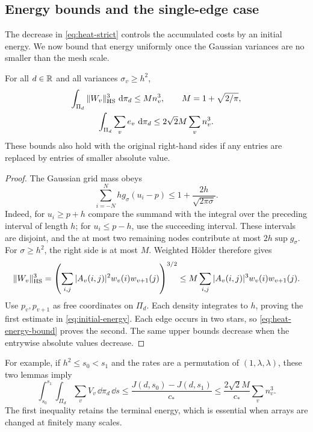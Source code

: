 \subsection{Energy bounds and the single-edge case}

The decrease in \eqref{eq:heat-strict} controls the accumulated costs by
an initial energy.  We now bound that energy uniformly once the
Gaussian variances are no smaller than the mesh scale.

\begin{lemma}\label{lem:initial-energy}
For all $d\in\mathbb R$ and all variances $\sigma_v\ge h^2$,
\begin{equation}\label{eq:initial-energy}
 \begin{gathered}
 \int_{\Pi_d}\|W_v\|_{\mathrm{HS}}^3\,\,\mathrm d\pi_d\le M n_v^3,
 \qquad M=1+\sqrt{2/\pi},\\
 \int_{\Pi_d}\sum_ve_v\,\,\mathrm d\pi_d
       \le2\sqrt2 M\sum_v n_v^3.
 \end{gathered}
\end{equation}
These bounds also hold with the original right-hand sides if any entries
are replaced by entries of smaller absolute value.
\end{lemma}

\begin{proof}
The Gaussian grid mass obeys
\begin{equation}\label{eq:heat-mesh-mass}
 \sum_{i=-N}^Nh g_\sigma(u_i-p)
 \le1+\frac{2h}{\sqrt{2\pi\sigma}}.
\end{equation}
Indeed, for $u_i\ge p+h$ compare the summand with the integral over the
preceding interval of length $h$; for $u_i\le p-h$, use the succeeding
interval.  These intervals are disjoint, and the at most two remaining
nodes contribute at most $2h\sup g_\sigma$.
For $\sigma\ge h^2$, the right side is at most $M$.
Weighted H\"older therefore gives
\[
 \|W_v\|_{\mathrm{HS}}^3
 =\left(\sum_{i,j}|A_v(i,j)|^2w_v(i)w_{v+1}(j)\right)^{3/2}
 \le M\sum_{i,j}|A_v(i,j)|^3w_v(i)w_{v+1}(j).
\]
Use $p_v,p_{v+1}$ as free coordinates on $\Pi_d$.  Each density
integrates to $h$, proving the first estimate in
\eqref{eq:initial-energy}.  Each edge occurs in two stars, so
\eqref{eq:heat-energy-bound} proves the second.  The same upper bounds
decrease when the entrywise absolute values decrease.
\end{proof}

For example, if $h^2\le s_0<s_1$ and the rates are a permutation of
$(1,\lambda,\lambda)$, these two lemmas imply
\begin{equation}\label{eq:heat-fixed-array-integral}
 \int_{s_0}^{s_1}\int_{\Pi_d}\sum_vV_v\,\dd\pi_d\,\dd s
 \le\frac{J(d,s_0)-J(d,s_1)}{c_*}
 \le\frac{2\sqrt2 M}{c_*}\sum_v n_v^3.
\end{equation}
The first inequality retains the terminal energy, which is essential
when arrays are changed at finitely many scales.

